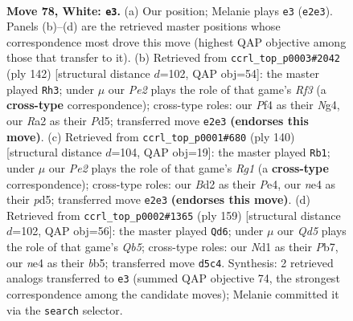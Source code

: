 \documentclass[11pt]{article}
\begin{document}
\clearpage

\begin{figure}[p]\centering
\begin{subfigure}{0.46\textwidth}\centering
\resizebox{\linewidth}{!}{%
\newchessgame
\chessboard[
  setfen={1r6/4q1k1/5b2/P1pQ1p2/3pnPp1/8/R2BP3/3NK3 w - - 16 78},
  showmover=false,
  pgfstyle=straightmove, color=movearrow, markmove={e2-e3}
]}
\caption{}
\end{subfigure}\hfill
\begin{subfigure}{0.46\textwidth}\centering
\resizebox{\linewidth}{!}{%
\newchessgame
\chessboard[
  setfen={5r1k/1n2q3/1pQp3P/b2PpBp1/4P1N1/5R2/5PK1/8 w - - 11 72},
  showmover=false,
  pgfstyle=straightmove, color=movearrow, markmove={f3-h3}
]}
\caption{}
\end{subfigure}
\\[4pt]
\begin{subfigure}{0.46\textwidth}\centering
\resizebox{\linewidth}{!}{%
\newchessgame
\chessboard[
  setfen={2Q2b1k/4qb2/8/3ppB2/2p1P3/5P1P/1p6/6RK w - - 0 71},
  showmover=false,
  pgfstyle=straightmove, color=movearrow, markmove={g1-b1}
]}
\caption{}
\end{subfigure}\hfill
\begin{subfigure}{0.46\textwidth}\centering
\resizebox{\linewidth}{!}{%
\newchessgame
\chessboard[
  setfen={8/1p3pk1/6p1/1B1Pp3/Pq1bP3/3Q2P1/5PK1/8 b - - 60 80},
  showmover=false,
  pgfstyle=straightmove, color=movearrow, markmove={b4-d6}
]}
\caption{}
\end{subfigure}
\caption{\textbf{Move 78, White: \texttt{e3}.} (a) Our position; Melanie plays \texttt{e3} (\texttt{e2e3}). Panels (b)--(d) are the retrieved master positions whose correspondence most drove this move (highest QAP objective among those that transfer to it). (b) Retrieved from \texttt{ccrl\_top\_p0003\#2042} (ply 142) [structural distance $d$=102, QAP obj=54]: the master played \texttt{Rh3}; under $\mu$ our \emph{Pe2} plays the role of that game's \emph{Rf3} (a \textbf{cross-type} correspondence); cross-type roles: our \emph{P}f4 as their \emph{N}g4, our \emph{R}a2 as their \emph{P}d5; transferred move \texttt{e2e3} \textbf{(endorses this move)}. (c) Retrieved from \texttt{ccrl\_top\_p0001\#680} (ply 140) [structural distance $d$=104, QAP obj=19]: the master played \texttt{Rb1}; under $\mu$ our \emph{Pe2} plays the role of that game's \emph{Rg1} (a \textbf{cross-type} correspondence); cross-type roles: our \emph{B}d2 as their \emph{P}e4, our \emph{n}e4 as their \emph{p}d5; transferred move \texttt{e2e3} \textbf{(endorses this move)}. (d) Retrieved from \texttt{ccrl\_top\_p0002\#1365} (ply 159) [structural distance $d$=102, QAP obj=56]: the master played \texttt{Qd6}; under $\mu$ our \emph{Qd5} plays the role of that game's \emph{Qb5}; cross-type roles: our \emph{N}d1 as their \emph{P}b7, our \emph{n}e4 as their \emph{b}b5; transferred move \texttt{d5c4}. Synthesis: 2 retrieved analogs transferred to \texttt{e3} (summed QAP objective 74, the strongest correspondence among the candidate moves); Melanie committed it via the \texttt{search} selector.}
\label{fig:thought-m154}
\end{figure}
\end{document}
